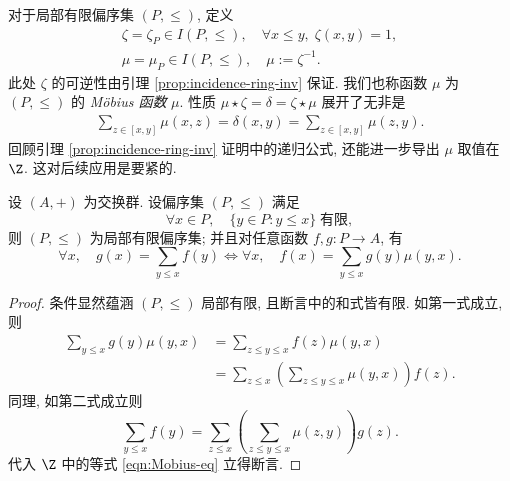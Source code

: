 对于局部有限偏序集 $(P,\leq)$, 定义
\begin{gather*}
	\zeta = \zeta_P \in I(P, \leq), \quad \forall x \leq y, \; \zeta(x,y) = 1, \\
	\mu = \mu_P \in I(P, \leq), \quad \mu := \zeta^{-1}.
\end{gather*}
此处 $\zeta$ 的可逆性由引理 \ref{prop:incidence-ring-inv} 保证. 我们也称函数 $\mu$ 为 $(P, \leq)$ 的 \emph{Möbius 函数} $\mu$. 性质 $\mu \star \zeta = \delta = \zeta \star \mu$ 展开了无非是
\begin{gather}\label{eqn:Mobius-eq}
	\sum_{z \in [x,y]} \mu(x,z) = \delta(x,y) = \sum_{z \in [x,y]} \mu(z,y).
\end{gather}
回顾引理 \ref{prop:incidence-ring-inv} 证明中的递归公式, 还能进一步导出 $\mu$ 取值在 $\Z$. 这对后续应用是要紧的.

\begin{proposition}\label{prop:Mobius-inversion}
	设 $(A,+)$ 为交换群. 设偏序集 $(P,\leq)$ 满足
	\[ \forall x \in P, \quad \{y \in P: y \leq x \} \;\text{有限}, \]
	则 $(P,\leq)$ 为局部有限偏序集; 并且对任意函数 $f,g: P \to A$, 有
	\[ \forall x,\quad g(x) = \sum_{y \leq x} f(y) \iff \forall x,\quad f(x) = \sum_{y \leq x} g(y) \mu(y,x). \]
\end{proposition}
\begin{proof}
	条件显然蕴涵 $(P,\leq)$ 局部有限, 且断言中的和式皆有限. 如第一式成立, 则
	\begin{align*}
	\sum_{y \leq x} g(y) \mu(y,x) & = \sum_{z \leq y \leq x} f(z) \mu(y,x) \\
	& = \sum_{z \leq x} \left( \sum_{z \leq y \leq x} \mu(y,x) \right) f(z).
	\end{align*}
	同理, 如第二式成立则
	\[ \sum_{y \leq x} f(y) = \sum_{z \leq x} \left( \sum_{z \leq y \leq x} \mu(z,y)\right) g(z). \]
	代入 $\Z$ 中的等式 \eqref{eqn:Mobius-eq} 立得断言.
\end{proof}

